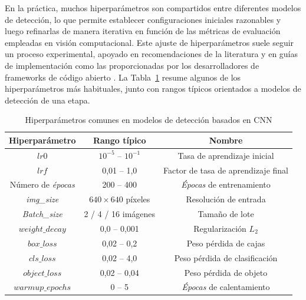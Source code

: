 \par En la práctica, muchos hiperparámetros son compartidos entre diferentes modelos de detección, lo que permite establecer configuraciones iniciales razonables y luego refinarlas de manera iterativa en función de las métricas de evaluación empleadas en visión computacional. Este ajuste de hiperparámetros suele seguir un proceso experimental, apoyado en recomendaciones de la literatura y en guías de implementación como las proporcionadas por los desarrolladores de frameworks de código abierto \cite{ultralyticsHyperparameterTuning}. La Tabla~\ref{tab:2-hiperparametros-comunes-cnn} resume algunos de los hiperparámetros más habituales, junto con rangos típicos orientados a modelos de detección de una etapa. \\

\begin{table}[H]
    \centering
    \caption{Hiperparámetros comunes en modelos de detección basados en CNN}
    \begin{tabular}{|c|c|c|}
        \hline
        \textbf{Hiperparámetro} & \textbf{Rango típico} & \textbf{Nombre} \\ 
        \hline
        $lr0$ & $10^{-5}$ -- $10^{-1}$ & Tasa de aprendizaje inicial \\ 
        \hline
        $lrf$ & 0,01 -- 1,0 & Factor de tasa de aprendizaje final \\ 
        \hline
        Número de \textit{épocas} & 200 -- 400 & \textit{Épocas} de entrenamiento \\ 
        \hline
        \textit{img\_size} & $640 \times 640$ píxeles & Resolución de entrada \\ 
        \hline
        \textit{Batch\_size} & 2 / 4 / 16 imágenes & Tamaño de lote \\ 
        \hline
        $weight\_decay$ & 0,0 -- 0,001 & Regularización $L_2$ \\ 
        \hline
        $box\_loss$ & 0,02 -- 0,2 & Peso pérdida de cajas \\ 
        \hline
        $cls\_loss$ & 0,02 -- 4,0 & Peso pérdida de clasificación \\ 
        \hline
        $object\_loss$ & 0,02 -- 0,04 & Peso pérdida de objeto \\ 
        \hline
        $warmup\_epochs$ & 0 -- 5 & \textit{Épocas} de calentamiento \\ 
        \hline
    \end{tabular}
    \label{tab:2-hiperparametros-comunes-cnn}
\end{table}

